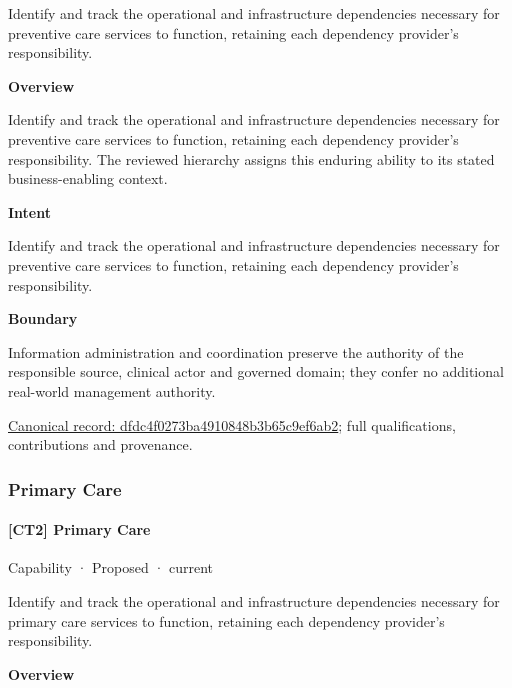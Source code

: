 Identify and track the operational and infrastructure dependencies necessary for preventive care services to function, retaining each dependency provider's responsibility.



\textbf{Overview}



Identify and track the operational and infrastructure dependencies necessary for preventive care services to function, retaining each dependency provider's responsibility. The reviewed hierarchy assigns this enduring ability to its stated business-enabling context.



\textbf{Intent}



Identify and track the operational and infrastructure dependencies necessary for preventive care services to function, retaining each dependency provider's responsibility.



\textbf{Boundary}



Information administration and coordination preserve the authority of the responsible source, clinical actor and governed domain; they confer no additional real-world management authority.


{\footnotesize \href{../../../../continuum/strategy/capability/dfdc4f0273ba4910848b3b65c9ef6ab2.md}{Canonical record: dfdc4f0273ba4910848b3b65c9ef6ab2}; full qualifications, contributions and provenance.}\par
\subsubsection{Primary Care}

\paragraph{[CT2] Primary Care}

\label{element:d118673d77d74c8cb8cec24f03adddd8}
{\small Capability · Proposed · current}\par

Identify and track the operational and infrastructure dependencies necessary for primary care services to function, retaining each dependency provider's responsibility.



\textbf{Overview}



